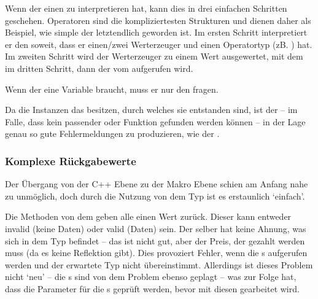       Wenn der  einen  zu interpretieren hat, kann dies in drei einfachen Schritten geschehen. Operatoren sind die kompliziertesten Strukturen und dienen daher als Beispiel, wie
      simple %
      der  letztendlich geworden ist. %
      Im ersten Schritt interpretiert er den  soweit, dass er einen/zwei Werterzeuger und einen Operatortyp (zB. \myMinin{==}) hat. Im zweiten Schritt wird der Werterzeuger zu einem Wert ausgewertet, mit dem im dritten Schritt, dann der  vom  aufgerufen wird.

      Wenn der  eine Variable braucht, muss er nur den  fragen.

      Da die  Instanzen das  besitzen, durch welches sie entstanden sind, ist der  -- im Falle, dass kein passender  oder Funktion gefunden werden können -- in der Lage genau so gute Fehlermeldungen zu produzieren, wie der .


    \subsubsection{Komplexe Rückgabewerte}
    \label{sssec:Komplexe Rückgabewerte}
      Der Übergang von der C++ Ebene zu der Makro Ebene schien %
      am Anfang nahe zu unmöglich, doch durch die Nutzung von dem  Typ ist es erstaunlich `einfach'. %

      Die  Methoden von dem  geben alle einen  Wert zurück. Dieser kann entweder
      invalid (keine Daten) oder valid (Daten) %
      sein. Der  selber hat keine Ahnung, was sich in dem  Typ befindet -- das ist nicht gut, aber der Preis, der gezahlt werden muss (da es keine Reflektion gibt). Dies provoziert Fehler, wenn die s aufgerufen werden und der erwartete Typ nicht übereinstimmt. Allerdings ist dieses Problem nicht `neu' -- die s sind von dem Problem ebenso geplagt -- was zur Folge hat, dass die  Parameter für die s geprüft werden, bevor mit diesen gearbeitet wird.

